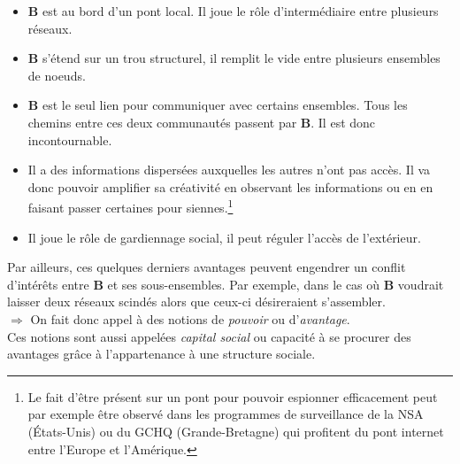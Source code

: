 \vspace{1ex}
\begin{itemize}
\item \textbf{B} est au bord d'un pont local. Il joue le rôle d'intermédiaire entre plusieurs réseaux.
\item \textbf{B} s'étend sur un trou structurel, il remplit le vide entre plusieurs ensembles de noeuds.
\item \textbf{B} est le seul lien pour communiquer avec certains ensembles. Tous les chemins entre ces deux communautés passent par \textbf{B}. Il est donc incontournable.
\item Il a des informations dispersées auxquelles les autres n'ont pas accès. Il va donc pouvoir amplifier sa créativité en observant les informations ou en en faisant passer certaines pour siennes.\footnote{Le fait d'être présent sur un pont pour pouvoir espionner efficacement peut par exemple être observé dans les programmes de surveillance de la NSA (États-Unis) ou du GCHQ (Grande-Bretagne) qui profitent du pont internet entre l'Europe et l'Amérique.}
\item Il joue le rôle de gardiennage social, il peut réguler l'accès de l'extérieur.
\end{itemize}

Par ailleurs, ces quelques derniers avantages peuvent engendrer un conflit d'intérêts entre \textbf{B} et ses sous-ensembles. Par exemple, dans le cas où \textbf{B} voudrait laisser deux réseaux scindés alors que ceux-ci désireraient s'assembler.\\

$\Rightarrow$ On fait donc appel à des notions de \textit{pouvoir} ou d'\textit{avantage}.\\

Ces notions sont aussi appelées \textit{capital social} ou capacité à se procurer des avantages grâce à l'appartenance à une structure sociale.

%

